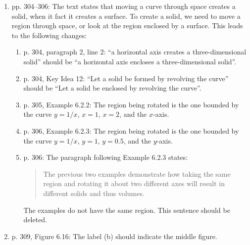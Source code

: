 \documentclass{amsart}
\begin{document}
\begin{enumerate}
\item pp. 304--306: The text states that moving a curve through space creates a solid, when it fact it creates a surface. To create a solid, we need to move a region through space, or look at the region enclosed by a surface. This leads to the following changes:
\begin{enumerate}
\item p. 304, paragraph 2, line 2: ``a horizontal axis creates a three-dimensional solid'' should be ``a horizontal axis encloses a three-dimensional solid''.
\item p. 304, Key Idea 12: ``Let a solid be formed by revolving the curve'' should be ``Let a solid be enclosed by revolving the curve''.
\item p. 305, Example 6.2.2: The region being rotated is the one bounded by the curve $y=1/x$, $x=1$, $x=2$, and the $x$-axis.
\item p. 306, Example 6.2.3: The region being rotated is the one bounded by the curve $y=1/x$, $y=1$, $y=0.5$, and the $y$-axis.
\item p. 306: The paragraph following Example 6.2.3 states:
\begin{quote}
The previous two examples demonstrate how taking the same region and rotating it about two different axes will result in different solids and thus volumes.
\end{quote}
The examples do not have the same region. This sentence should be deleted.
\end{enumerate}
\item p. 309, Figure 6.16: The label (b) should indicate the middle figure.
\label{2016-08Iplus}
\end{enumerate}
\end{document}
